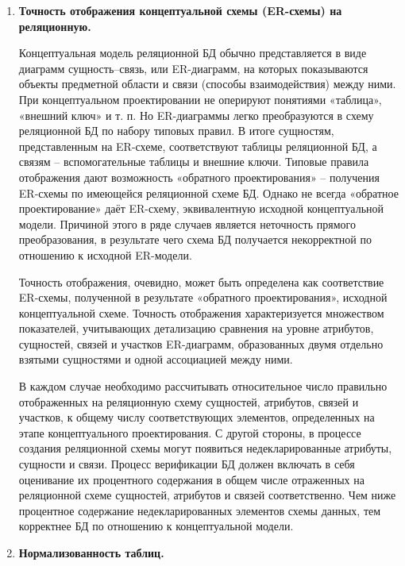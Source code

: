 \begin{enumerate}
    \item \textbf{Точность отображения концептуальной схемы (ER-схемы) на реляционную.}

        Концептуальная модель реляционной БД обычно представляется в виде диаграмм сущность–связь, или ER-диаграмм,
        на которых показываются объекты предметной области и связи (способы взаимодействия) между ними. При
        концептуальном проектировании не оперируют понятиями «таблица», «внешний ключ» и т. п. Но ER-диаграммы
        легко преобразуются в схему реляционной БД по набору типовых правил. В итоге сущностям, представленным на ER-схеме,
        соответствуют таблицы реляционной БД, а связям – вспомогательные таблицы и внешние ключи. Типовые правила
        отображения дают возможность «обратного проектирования» – получения ER-схемы по имеющейся реляционной схеме БД.
        Однако не всегда «обратное проектирование» даёт ER-схему, эквивалентную исходной концептуальной модели.
        Причиной этого в ряде случаев является неточность прямого преобразования, в результате чего схема БД получается
        некорректной по отношению к исходной ER-модели.

        Точность отображения, очевидно, может быть определена как соответствие ER-схемы, полученной в результате
        «обратного проектирования», исходной концептуальной схеме. Точность отображения характеризуется множеством
        показателей, учитывающих детализацию сравнения на уровне атрибутов, сущностей, связей и участков ER-диаграмм,
        образованных двумя отдельно взятыми сущностями и одной ассоциацией между ними.

        В каждом случае необходимо рассчитывать относительное число правильно отображенных на реляционную схему
        сущностей, атрибутов, связей и участков, к общему числу соответствующих элементов, определенных на этапе
        концептуального проектирования. С другой стороны, в процессе создания реляционной схемы могут появиться
        недекларированные атрибуты, сущности и связи. Процесс верификации БД должен включать в себя оценивание их
        процентного содержания в общем числе отраженных на реляционной схеме сущностей, атрибутов и связей
        соответственно. Чем ниже процентное содержание недекларированных элементов схемы данных, тем корректнее БД
        по отношению к концептуальной модели.

    \item \textbf{Нормализованность таблиц.}


\end{enumerate}
